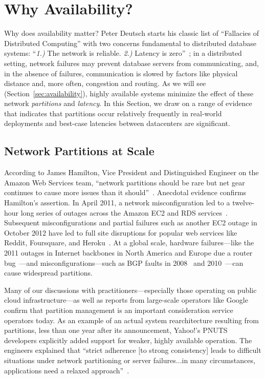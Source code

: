 
\section{Why Availability?}
\label{sec:motivation}

Why does availability matter? Peter Deutsch starts his classic list of
``Fallacies of Distributed Computing'' with two concerns fundamental
to distributed database systems: ``\textit{1.)}  The network is
reliable. \textit{2.)} Latency is zero''~\cite{fallacies-deutsch}; in
a distributed setting, network failures may prevent database servers
from communicating, and, in the absence of failures, communication is
slowed by factors like physical distance and, more often, congestion
and routing. As we will see (Section~\ref{sec:availability}), highly
available systems minimize the effect of these network
\textit{partitions} and \textit{latency}. In this Section, we draw on
a range of evidence that indicates that partitions occur relatively
frequently in real-world deployments and best-case latencies between
datacenters are significant.

\subsection{Network Partitions at Scale}

According to James Hamilton, Vice President and Distinguished Engineer
on the Amazon Web Services team, ``network partitions should be rare
but net gear continues to cause more issues than it
should''~\cite{hamilton-partitions}. Anecdotal evidence confirms
Hamilton's assertion. In April 2011, a network misconfiguration led to
a twelve-hour long series of outages across the Amazon EC2 and RDS
services~\cite{amazon-netpartition}. Subsequent misconfigurations and
partial failures such as another EC2 outage in October 2012 have led
to full site disruptions for popular web services like Reddit,
Foursquare, and Heroku~\cite{ec2-downsites}. At a global scale,
hardware failures---like the 2011 outages in Internet backbones in
North America and Europe due a router
bug~\cite{juniper-partition}---and misconfigurations---such as BGP
faults in 2008~\cite{pakistan-youtube} and
2010~\cite{research-experiment-partition}---can cause widespread
partitions.

Many of our discussions with practitioners---especially those
operating on public cloud infrastructure---as well as reports from
large-scale operators like Google~\cite{dean-keynote} confirm that
partition management is an important consideration service operators
today. As an example of an actual system rearchitecture resulting from
partitions, less than one year after its announcement, Yahoo!'s PNUTS
developers explicitly added support for weaker, highly available
operation. The engineers explained that ``strict adherence [to strong
  consistency] leads to difficult situations under network
partitioning or server failures...in many circumstances, applications
need a relaxed approach''~\cite{pnuts-update}.

